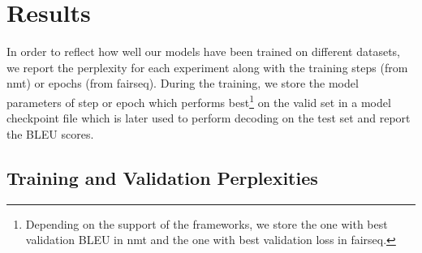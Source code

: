 \section{Results} \label{section:results}

In order to reflect how well our models have been trained on different datasets, we report the perplexity for each experiment along with the training steps (from nmt) or epochs (from fairseq). During the training, we store the model parameters of step or epoch which performs best\footnote{Depending on the support of the frameworks, we store the one with best validation BLEU in nmt and the one with best validation loss in fairseq.} on the valid set in a model checkpoint file which is later used to perform decoding on the test set and report the BLEU scores.

\subsection{Training and Validation Perplexities}


